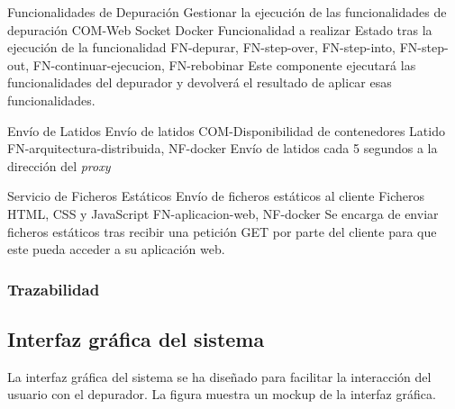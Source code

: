 \begin{component}{Funcionalidades de Depuración}
{Gestionar la ejecución de las funcionalidades de depuración}
{COM-Web Socket Docker} %
{Funcionalidad a realizar} %
{Estado tras la ejecución de la funcionalidad} %
{FN-depurar, FN-step-over, FN-step-into, FN-step-out, FN-continuar-ejecucion, FN-rebobinar} %
Este componente ejecutará las funcionalidades del depurador y devolverá el resultado de aplicar esas funcionalidades. %
\end{component}

\begin{component}{Envío de Latidos}
{Envío de latidos}
{COM-Disponibilidad de contenedores} %
{\NA} %
{Latido} %
{FN-arquitectura-distribuida, NF-docker} %
Envío de latidos cada 5 segundos a la dirección del \textit{\gls{proxy}}
\end{component}

\begin{component}{Servicio de Ficheros Estáticos}
{Envío de ficheros estáticos al cliente}
{\NA}
{Ficheros HTML, CSS y JavaScript}
{FN-aplicacion-web, NF-docker} %
{Se encarga de enviar ficheros estáticos tras recibir una petición GET por parte del cliente para que este pueda acceder a su aplicación web.}
\end{component}

\FloatBarrier


\begin{landscape}
    \subsubsection{Trazabilidad} {\label{subsubsec:trazabilidad-comp}}
    \begin{table}[htb]
        {\traceabilityCompFN}
    \end{table}
\end{landscape}


\subsection{Interfaz gráfica del sistema} \label{sec:interfaz-grafica}
La interfaz gráfica del sistema se ha diseñado para facilitar la interacción del usuario con el depurador. La figura  muestra un mockup de la interfaz gráfica.

